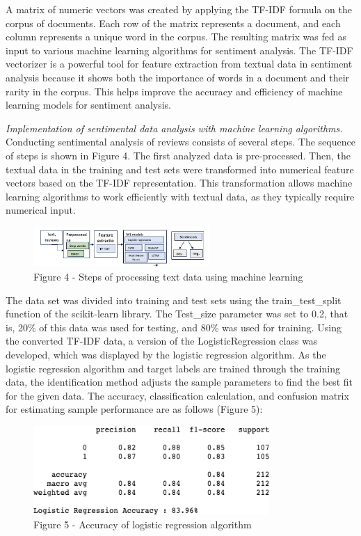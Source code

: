\begin{multicols}{2}
A matrix of numeric vectors was created by applying the TF-IDF formula
on the corpus of documents. Each row of the matrix represents a
document, and each column represents a unique word in the corpus. The
resulting matrix was fed as input to various machine learning algorithms
for sentiment analysis. The TF-IDF vectorizer is a powerful tool for
feature extraction from textual data in sentiment analysis because it
shows both the importance of words in a document and their rarity in the
corpus. This helps improve the accuracy and efficiency of machine
learning models for sentiment analysis.

\emph{Implementation of sentimental data analysis with machine learning
algorithms.} Conducting sentimental analysis of reviews consists of
several steps. The sequence of steps is shown in Figure 4. The first
analyzed data is pre-processed. Then, the textual data in the training
and test sets were transformed into numerical feature vectors based on
the TF-IDF representation. This transformation allows machine learning
algorithms to work efficiently with textual data, as they typically
require numerical input.
\end{multicols}


\begin{figure}[H]
	\centering
	\includegraphics[width=0.6\textwidth]{media/ict/image10.2}
	\caption*{Figure 4 - Steps of processing text data using machine learning}
\end{figure}

The data set was divided into training and test sets using the
train\_test\_split function of the scikit-learn library. The Test\_size
parameter was set to 0.2, that is, 20\% of this data was used for
testing, and 80\% was used for training. Using the converted TF-IDF
data, a version of the LogisticRegression class was developed, which was
displayed by the logistic regression algorithm. As the logistic
regression algorithm and target labels are trained through the training
data, the identification method adjusts the sample parameters to find
the best fit for the given data. The accuracy, classification
calculation, and confusion matrix for estimating sample performance are
as follows (Figure 5):

\begin{figure}[H]
	\centering
	\includegraphics[width=0.8\textwidth]{media/ict/image12}
	\caption*{Figure 5 - Accuracy of logistic regression algorithm}
\end{figure}

